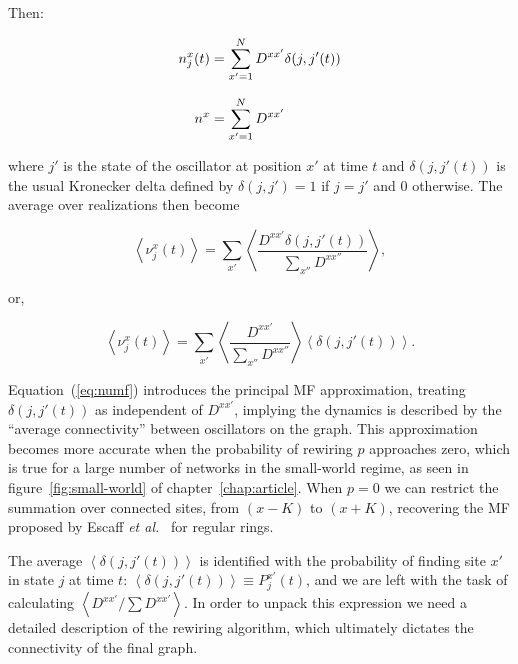 \noindent Then:

\begin{align}
  n^x_j(t) &= \sum\limits_{x'=1}^ND^{xx'}\delta(j,j'(t)) \notag\\[8pt]
  n^x &= \sum\limits_{x'=1}^ND^{xx'}
\end{align}

\noindent where $j'$ is the state of the oscillator at position $x'$ at time $t$ and $\delta(j,j'(t))$ is the usual Kronecker delta
defined by $\delta(j,j')=1$ if $ j=j'$ and $0$ otherwise. The average over realizations then become

\begin{equation*}
  \left< \nu^x_j(t) \right> = \sum_{x'} \left< \frac{D^{xx'}\delta(j,j'(t))}{\sum_{x''}D^{xx''}} \right>,
\end{equation*}

\noindent or,

\begin{equation}
  \left< \nu^x_j(t) \right> = \sum_{x'} \left< \frac{D^{xx'}}{\sum_{x''}D^{xx''}}\right>\left<\delta(j,j'(t)) \right>.
  \label{eq:numf}
\end{equation}

\noindent Equation~(\ref{eq:numf}) introduces the principal MF approximation, treating $\delta(j,j'(t))$ as independent of $D^{xx'}$,
implying the dynamics is described by the ``average connectivity'' between oscillators on the graph. This approximation becomes more
accurate when the probability of rewiring $p$ approaches zero, which is true for a large number of networks in the small-world regime,
as seen in figure~\ref{fig:small-world} of chapter~\ref{chap:article}. When $p=0$ we can restrict the summation over connected sites,
from $(x-K)$ to $(x+K)$, recovering the MF proposed by Escaff \textit{et al.}~\cite{escaff2014arrays} for regular rings.

The average $\left< \delta(j,j'(t)) \right>$ is identified with the probability of finding site $x'$ in state $j$ at time $t$: $\left<
\delta(j,j'(t)) \right> \equiv P_j^{x'}(t)$, and we are left with the task of calculating $\left< D^{xx'}/\sum D^{xx'} \right>$. In
order to unpack this expression we need a detailed description of the rewiring algorithm, which ultimately dictates the connectivity of
the final graph.

